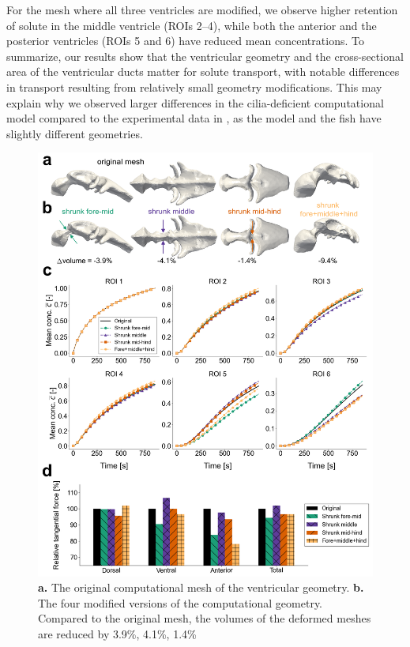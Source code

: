 \documentclass{WileyMSP-template}
\begin{document}
For the mesh where all three ventricles are modified,
we observe higher retention of solute in the middle ventricle (ROIs 2--4),
while both the anterior and the posterior ventricles (ROIs 5 and 6) have reduced
mean concentrations. To summarize, our results show that the
ventricular geometry and the cross-sectional area of the ventricular ducts matter
for solute transport, with notable differences in transport resulting from
relatively small geometry modifications. This may explain why
we observed larger differences in the cilia-deficient computational
model compared to the experimental data in ,
as the model and the fish have slightly different geometries.
\begin{figure}
    \centering
    \includegraphics[width=\textwidth]{graphics/figure6_compare_modified_geometries.png}
    \caption{\textbf{a.} The original computational mesh of the ventricular geometry.
    \textbf{b.} The four modified versions of the computational geometry. Compared
    to the original mesh, the volumes of the deformed meshes are reduced by 3.9\%, 4.1\%, 1.4\% 
}
\end{figure}
\end{document}

